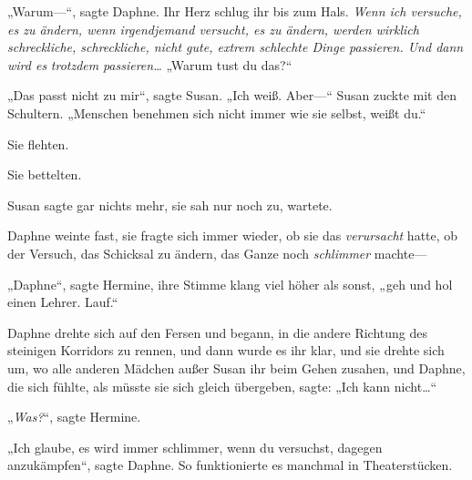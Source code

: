„Warum—“, sagte Daphne. Ihr Herz schlug ihr bis zum Hals. \emph{Wenn ich versuche, es zu ändern, wenn irgendjemand versucht, es zu ändern, werden wirklich schreckliche, schreckliche, nicht gute, extrem schlechte Dinge passieren. Und dann wird es} \emph{trotzdem} \emph{passieren…} „Warum tust du das?“

„Das passt nicht zu mir“, sagte Susan. „Ich weiß. Aber—“ Susan zuckte mit den Schultern. „Menschen benehmen sich nicht immer wie sie selbst, weißt du.“

Sie flehten.

Sie bettelten.

Susan sagte gar nichts mehr, sie sah nur noch zu, wartete.

Daphne weinte fast, sie fragte sich immer wieder, ob sie das \emph{verursacht} hatte, ob der Versuch, das Schicksal zu ändern, das Ganze noch \emph{schlimmer} machte—

„Daphne“, sagte Hermine, ihre Stimme klang viel höher als sonst, „geh und hol einen Lehrer. Lauf.“

Daphne drehte sich auf den Fersen und begann, in die andere Richtung des steinigen Korridors zu rennen, und dann wurde es ihr klar, und sie drehte sich um, wo alle anderen Mädchen außer Susan ihr beim Gehen zusahen, und Daphne, die sich fühlte, als müsste sie sich gleich übergeben, sagte: „Ich kann nicht…“

„\emph{Was?}“, sagte Hermine.

„Ich glaube, es wird immer schlimmer, wenn du versuchst, dagegen anzukämpfen“, sagte Daphne. So funktionierte es manchmal in Theaterstücken.

